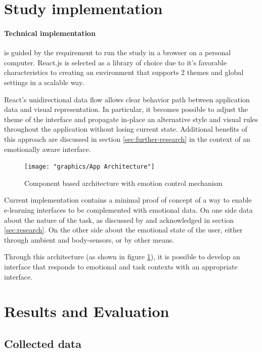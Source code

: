 
\section{Study implementation}



\paragraph{Technical implementation} is guided by the requirement to run the study in a browser on a personal computer. React.js is selected as a library of choice due to it's favorable characteristics to creating an environment that supports 2 themes and global settings in a scalable way. 


React's unidirectional data flow allows clear behavior path between application data and visual representation. In particular, it becomes possible to adjust the theme of the interface and propagate in-place an alternative style and visual rules throughout the application without losing current state. Additional benefits of this approach are discussed in section \ref{sec:further-research} in the context of an emotionally aware interface.

\begin{figure}
	\centering
	\texttt{[image: "graphics/App Architecture"]}
	\caption{Component based architecture with emotion control mechanism}
	\label{fig:app-architecture}
\end{figure}

Current implementation contains a minimal proof of concept of a way to enable e-learning interfaces to be complemented with emotional data. On one side data about the nature of the task, as discussed by \cite{Haaranen2015} and acknowledged in section \ref{sec:research}. On the other side about the emotional state of the user, either through ambient and body-sensors, or by other means.

Through this architecture (as shown in figure \ref{fig:app-architecture}), it is possible to develop an interface that responds to emotional and task contexts with an appropriate interface.

\section{Results and Evaluation}

	\subsection{Collected data}
	
